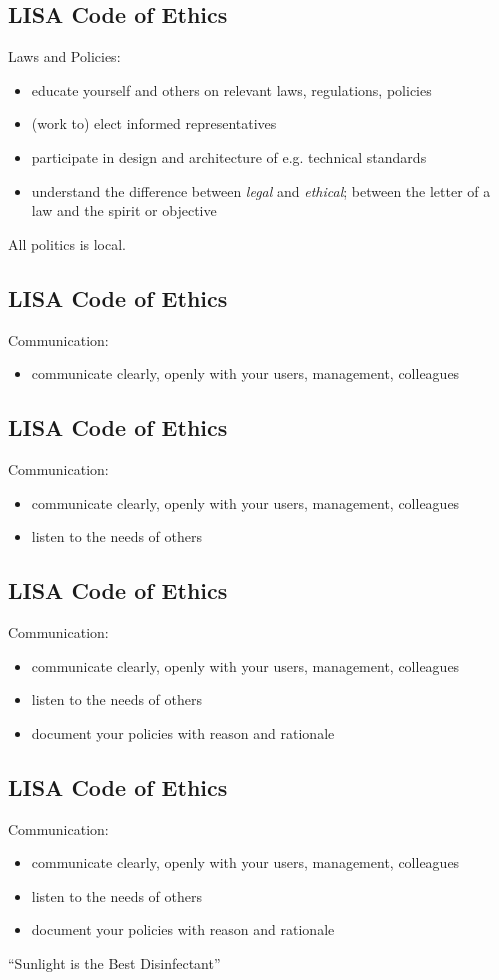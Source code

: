\documentclass[xga]{xdvislides}
\begin{document}
\subsection{LISA Code of Ethics}
Laws and Policies:
\begin{itemize}
	\item educate yourself and others on relevant laws, regulations, policies
	\item (work to) elect informed representatives
	\item participate in design and architecture of e.g. technical standards
	\item understand the difference between {\em
legal} and {\em ethical}; between the letter of a law
and the spirit or objective
\end{itemize}
\vspace{.5in}
All politics is local.

\subsection{LISA Code of Ethics}
Communication:
\begin{itemize}
	\item communicate clearly, openly with your users, management, colleagues
\end{itemize}

\subsection{LISA Code of Ethics}
Communication:
\begin{itemize}
	\item communicate clearly, openly with your users, management, colleagues
	\item listen to the needs of others
\end{itemize}

\subsection{LISA Code of Ethics}
Communication:
\begin{itemize}
	\item communicate clearly, openly with your users, management, colleagues
	\item listen to the needs of others
	\item document your policies with reason and rationale
\end{itemize}

\subsection{LISA Code of Ethics}
Communication:
\begin{itemize}
	\item communicate clearly, openly with your users, management, colleagues
	\item listen to the needs of others
	\item document your policies with reason and rationale
\end{itemize}
\vspace{.5in}
``Sunlight is the Best Disinfectant''
\end{document}
